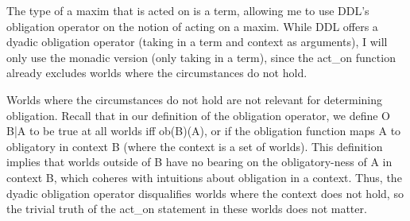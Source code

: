 \begin{isabellebody}
{The type of a maxim that is acted on is a term, allowing me
to use DDL's obligation operator on the notion of acting on a maxim. While DDL offers a dyadic obligation
operator (taking in a term and context as arguments), I will only use the monadic version (only 
taking in a term), since the act\_on function already excludes worlds where the circumstances do not hold.

Worlds where the circumstances do not hold are not relevant for determining obligation. Recall that in 
our definition of the obligation operator, we define O {B|A} to be true at all worlds iff ob(B)(A), or 
if the obligation function maps A to obligatory in context B (where the context is a set of worlds). This 
definition implies that worlds outside of B have no bearing on the obligatory-ness of A in context B, which 
coheres with intuitions about obligation in a context. Thus, the dyadic obligation operator 
disqualifies worlds where the context does not hold, so the trivial truth of the act\_on statement in 
these worlds does not matter. 

}
\end{isabellebody}
